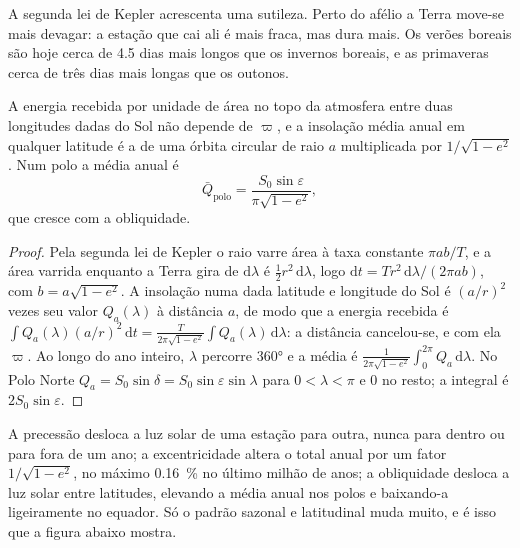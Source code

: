 A segunda lei de Kepler acrescenta uma sutileza. Perto do afélio a Terra move-se mais devagar: a estação que cai
ali é mais fraca, mas dura mais. Os verões boreais são hoje cerca de 4.5 dias mais longos que os
invernos boreais, e as primaveras cerca de três dias mais longas que os outonos.

\begin{proposition}\label{prop:b2:orbital-forcing:annual}
A energia recebida por unidade de área no topo da atmosfera entre duas longitudes dadas do
Sol não depende de $\varpi$, e a insolação média anual em qualquer latitude é a de uma
órbita circular de raio $a$ multiplicada por $1/\sqrt{1 - e^2}$. Num polo a média anual é
\[
  \bar Q_{\text{polo}} = \frac{S_0\sin\varepsilon}{\pi\sqrt{1 - e^2}} ,
\]
que cresce com a obliquidade.
\end{proposition}

\begin{proof}
Pela segunda lei de Kepler o raio varre área à taxa constante $\pi ab/T$, e a área varrida
enquanto a Terra gira de $\mathrm d\lambda$ é $\frac12 r^2\,\mathrm d\lambda$, logo $\mathrm dt =
T r^2\,\mathrm d\lambda/(2\pi ab)$, com $b = a\sqrt{1 - e^2}$. A insolação numa dada latitude
e longitude do Sol é $(a/r)^2$ vezes seu valor $Q_a(\lambda)$ à distância $a$, de modo que a
energia recebida é $\int Q_a(\lambda)(a/r)^2\,\mathrm dt = \frac{T}{2\pi\sqrt{1 - e^2}}\int
Q_a(\lambda)\,\mathrm d\lambda$: a distância cancelou-se, e com ela $\varpi$. Ao longo do ano
inteiro, $\lambda$ percorre \ang{360} e a média é $\frac{1}{2\pi\sqrt{1-e^2}}\int_0^{2\pi}
Q_a\,\mathrm d\lambda$. No Polo Norte $Q_a = S_0\sin\delta = S_0\sin\varepsilon\sin\lambda$
para $0 < \lambda < \pi$ e 0 no resto; a integral é $2S_0\sin\varepsilon$.
\end{proof}

A precessão desloca a luz solar de uma estação para outra, nunca para dentro ou para fora de um ano; a excentricidade
altera o total anual por um fator $1/\sqrt{1 - e^2}$, no máximo \qty{0.16}{\percent} no
último milhão de anos; a obliquidade desloca a luz solar entre latitudes, elevando a média anual nos
polos e baixando-a ligeiramente no equador. Só o padrão sazonal e latitudinal muda
muito, e é isso que a figura abaixo mostra.

